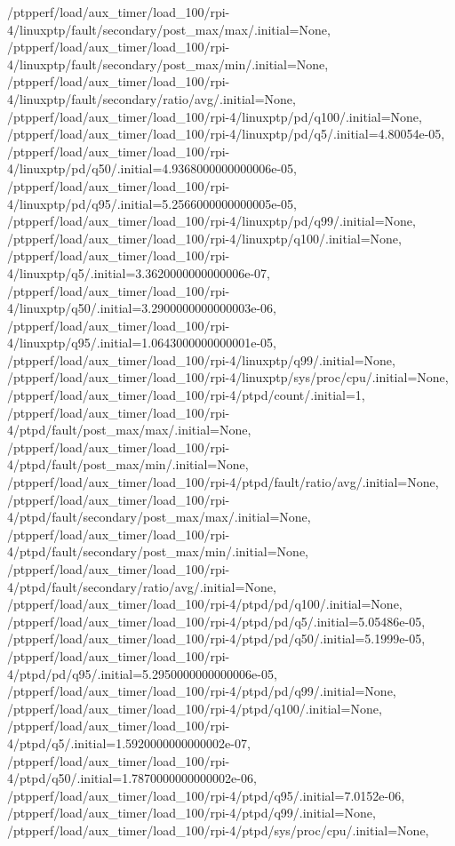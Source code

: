 {    /ptpperf/load/aux_timer/load_100/rpi-4/linuxptp/fault/secondary/post_max/max/.initial=None,
    /ptpperf/load/aux_timer/load_100/rpi-4/linuxptp/fault/secondary/post_max/min/.initial=None,
    /ptpperf/load/aux_timer/load_100/rpi-4/linuxptp/fault/secondary/ratio/avg/.initial=None,
    /ptpperf/load/aux_timer/load_100/rpi-4/linuxptp/pd/q100/.initial=None,
    /ptpperf/load/aux_timer/load_100/rpi-4/linuxptp/pd/q5/.initial=4.80054e-05,
    /ptpperf/load/aux_timer/load_100/rpi-4/linuxptp/pd/q50/.initial=4.9368000000000006e-05,
    /ptpperf/load/aux_timer/load_100/rpi-4/linuxptp/pd/q95/.initial=5.2566000000000005e-05,
    /ptpperf/load/aux_timer/load_100/rpi-4/linuxptp/pd/q99/.initial=None,
    /ptpperf/load/aux_timer/load_100/rpi-4/linuxptp/q100/.initial=None,
    /ptpperf/load/aux_timer/load_100/rpi-4/linuxptp/q5/.initial=3.3620000000000006e-07,
    /ptpperf/load/aux_timer/load_100/rpi-4/linuxptp/q50/.initial=3.2900000000000003e-06,
    /ptpperf/load/aux_timer/load_100/rpi-4/linuxptp/q95/.initial=1.0643000000000001e-05,
    /ptpperf/load/aux_timer/load_100/rpi-4/linuxptp/q99/.initial=None,
    /ptpperf/load/aux_timer/load_100/rpi-4/linuxptp/sys/proc/cpu/.initial=None,
    /ptpperf/load/aux_timer/load_100/rpi-4/ptpd/count/.initial=1,
    /ptpperf/load/aux_timer/load_100/rpi-4/ptpd/fault/post_max/max/.initial=None,
    /ptpperf/load/aux_timer/load_100/rpi-4/ptpd/fault/post_max/min/.initial=None,
    /ptpperf/load/aux_timer/load_100/rpi-4/ptpd/fault/ratio/avg/.initial=None,
    /ptpperf/load/aux_timer/load_100/rpi-4/ptpd/fault/secondary/post_max/max/.initial=None,
    /ptpperf/load/aux_timer/load_100/rpi-4/ptpd/fault/secondary/post_max/min/.initial=None,
    /ptpperf/load/aux_timer/load_100/rpi-4/ptpd/fault/secondary/ratio/avg/.initial=None,
    /ptpperf/load/aux_timer/load_100/rpi-4/ptpd/pd/q100/.initial=None,
    /ptpperf/load/aux_timer/load_100/rpi-4/ptpd/pd/q5/.initial=5.05486e-05,
    /ptpperf/load/aux_timer/load_100/rpi-4/ptpd/pd/q50/.initial=5.1999e-05,
    /ptpperf/load/aux_timer/load_100/rpi-4/ptpd/pd/q95/.initial=5.2950000000000006e-05,
    /ptpperf/load/aux_timer/load_100/rpi-4/ptpd/pd/q99/.initial=None,
    /ptpperf/load/aux_timer/load_100/rpi-4/ptpd/q100/.initial=None,
    /ptpperf/load/aux_timer/load_100/rpi-4/ptpd/q5/.initial=1.5920000000000002e-07,
    /ptpperf/load/aux_timer/load_100/rpi-4/ptpd/q50/.initial=1.7870000000000002e-06,
    /ptpperf/load/aux_timer/load_100/rpi-4/ptpd/q95/.initial=7.0152e-06,
    /ptpperf/load/aux_timer/load_100/rpi-4/ptpd/q99/.initial=None,
    /ptpperf/load/aux_timer/load_100/rpi-4/ptpd/sys/proc/cpu/.initial=None,
}
